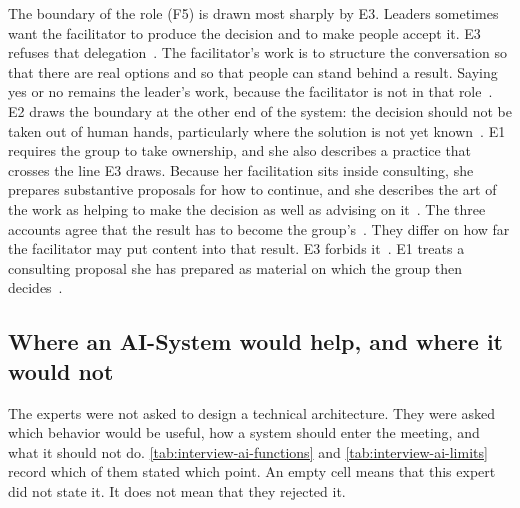 The boundary of the role (F5) is drawn most sharply by E3.
Leaders sometimes want the facilitator to produce the decision and to make people accept it.
E3 refuses that delegation~.
The facilitator's work is to structure the conversation so that there are real options and
so that people can stand behind a result.
Saying yes or no remains the leader's work, because the facilitator is not in that
role~.
E2 draws the boundary at the other end of the system: the decision should not be taken out
of human hands, particularly where the solution is not yet known~.
E1 requires the group to take ownership, and she also describes a practice that crosses the
line E3 draws.
Because her facilitation sits inside consulting, she prepares substantive proposals for how
to continue, and she describes the art of the work as helping to make the decision as well
as advising on it~.
The three accounts agree that the result has to become the group's~.
They differ on how far the facilitator may put content into that result.
E3 forbids it~.
E1 treats a consulting proposal she has prepared as material on which the group then
decides~.

\subsection{Where an AI-System would help, and where it would not}
\label{sec:interview-ai-cofacilitator}

The experts were not asked to design a technical architecture.
They were asked which behavior would be useful, how a system should enter the meeting, and
what it should not do.
\autoref{tab:interview-ai-functions} and \autoref{tab:interview-ai-limits} record which of
them stated which point.
An empty cell means that this expert did not state it.
It does not mean that they rejected it.

